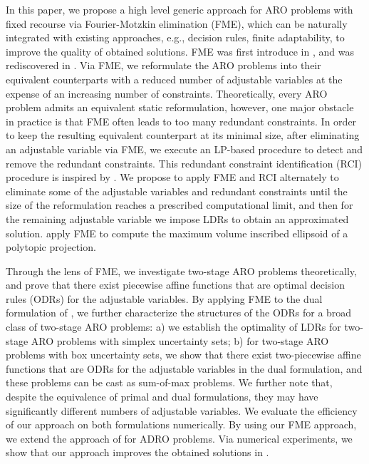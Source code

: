 \documentclass[fleqn,orsc,blindrev]{informs4}
\begin{document}
	In this paper, we propose a high level generic approach for ARO problems with fixed recourse via Fourier-Motzkin elimination (FME), which can be naturally integrated with existing approaches, e.g., decision rules, finite adaptability, to improve the quality of obtained solutions. FME was first introduce in \cite{f26}, and was rediscovered in \cite{m36}. Via FME, we reformulate the ARO problems into their equivalent counterparts with  {a} reduced number of adjustable variables at the expense of an increasing number of constraints. Theoretically, every ARO problem admits an equivalent static reformulation, however, one major obstacle in practice is that FME often leads to too many redundant constraints. In order to keep the resulting equivalent counterpart at its minimal size, after eliminating an adjustable variable via FME, we execute an LP-based procedure to detect and remove  the redundant constraints. This redundant constraint identification (RCI) procedure is inspired by \cite{cmp89}. We propose to apply FME and RCI alternately to eliminate some of the adjustable variables and redundant constraints  {until} the size of the reformulation reaches a prescribed computational limit, and then for the remaining adjustable variable we impose LDRs to obtain an approximated solution. \cite{zd17b} apply FME to compute the maximum volume inscribed ellipsoid of a polytopic projection.
	
	Through the lens of FME, we investigate two-stage ARO problems theoretically, and prove that there exist piecewise affine functions that are optimal decision rules (ODRs) for the adjustable variables. By applying FME to the dual formulation of \cite{bd16}, we further characterize the structures of the ODRs for a broad class of two-stage ARO problems: a) we establish the optimality of LDRs for two-stage ARO problems with simplex uncertainty sets; b) for two-stage ARO problems with box uncertainty sets, we show that there exist two-piecewise affine functions that are ODRs for the adjustable variables in the dual formulation, and these problems can be  {cast} as sum-of-max problems. We further note that, despite the equivalence of primal and dual formulations, they may have significantly different  {numbers} of adjustable variables. We evaluate the efficiency of our approach on both  formulations numerically. By using our FME approach, we extend the approach of \cite{bsz17} for ADRO problems. Via numerical experiments,  we show that our approach improves the obtained solutions in \cite{bsz17}.
	
\end{document}
